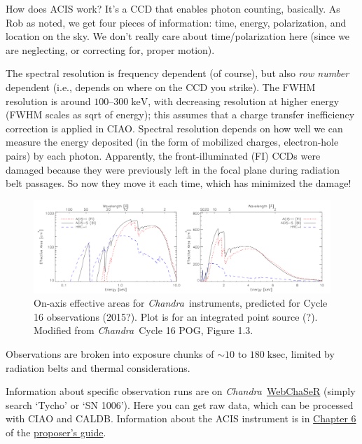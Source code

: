\documentclass[10pt]{article}
\newcommand{\mt}{\mathrm}
\newcommand{\unit}[1]{\; \mt{#1}} %
\newcommand{\abt}{\mathord{\sim}} %
\newcommand{\Chandra}{\textit{Chandra}}
\begin{document}
How does ACIS work?  It's a CCD that enables photon counting, basically.
As Rob as noted, we get four pieces of information: time, energy, polarization,
and location on the sky.  We don't really care about time/polarization here
(since we are neglecting, or correcting for, proper motion).

The spectral resolution is frequency dependent (of course), but also \emph{row
number} dependent (i.e., depends on where on the CCD you strike).  The FWHM
resolution is around $100$--$300 \unit{keV}$, with decreasing resolution at
higher energy (FWHM scales as sqrt of energy); this assumes that a charge
transfer inefficiency correction is applied in CIAO.
Spectral resolution depends on how well we can measure the
energy deposited (in the form of mobilized charges, electron-hole pairs) by
each photon.  Apparently, the front-illuminated (FI) CCDs were damaged because
they were previously left in the focal plane during radiation belt passages.
So now they move it each time, which has minimized the damage!

\begin{figure}[!ht]
    \centering
    \includegraphics[width=\textwidth]{fig_chandra_area.png}
    \caption{On-axis effective areas for \Chandra\ instruments, predicted for
    Cycle 16 observations (2015?). Plot is for an integrated point source (?).
    Modified from \Chandra\ Cycle 16 POG, Figure 1.3.}
    \label{fig:area}
\end{figure}

Observations are broken into exposure chunks of $\abt10$ to $180 \unit{ksec}$,
limited by radiation belts and thermal considerations.

Information about specific observation runs are on \Chandra\
\href{http://cda.harvard.edu/chaser/}{WebChaSeR}
(simply search `Tycho' or `SN 1006').  Here you can get raw data, which can be
processed with CIAO and CALDB.
Information about the ACIS instrument is in
\href{http://cxc.harvard.edu/proposer/POG/html/chap6.html}{Chapter 6} of the
\href{http://cxc.harvard.edu/proposer/POG/html/index.html}{proposer's guide}.
\end{document}
